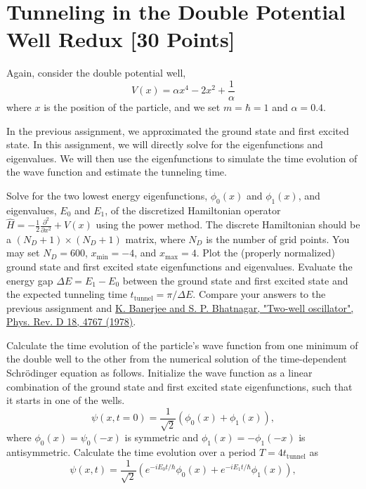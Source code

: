 \newpage
\section{Tunneling in the Double Potential Well Redux [30 Points]}

Again, consider the double potential well,
\begin{equation}
  V(x) =  \alpha x^4  - 2x^2 + \frac{1}{\alpha}
\end{equation}
where $x$ is the position of the particle, and we set $m=\hbar=1$ and $\alpha = 0.4$.

In the previous assignment, we approximated the ground state and first excited state.
In this assignment, we will directly solve for the eigenfunctions and eigenvalues.
We will then use the eigenfunctions to simulate the time evolution of the wave function and estimate the tunneling time.

\begin{problem}[10]
Solve for the two lowest energy eigenfunctions, $\phi_0(x)$ and $\phi_1(x)$, and eigenvalues, $E_0$ and $E_1$, of the discretized Hamiltonian operator $\hat H = -\frac{1}{2}\frac{\partial^2}{\partial x^2} + V(x)$ using the power method.
The discrete Hamiltonian should be a $(N_D+1)\times(N_D+1)$ matrix, where $N_D$ is the number of grid points.
You may set $N_D=600$, $x_{\min} = -4$, and $x_{\max} = 4$.
Plot the (properly normalized) ground state and first excited state eigenfunctions and eigenvalues.
Evaluate the energy gap $\Delta E = E_1 - E_0$ between the ground state and first excited state and the expected tunneling time $t_\mathrm{tunnel} = \pi/\Delta E$.
Compare your answers to the previous assignment and \href{http://doi.org/10.1103/PhysRevD.18.4767}{K. Banerjee and S. P. Bhatnagar, "Two-well oscillator", Phys. Rev. D 18, 4767 (1978)}.
\end{problem}

\begin{solution}
\end{solution}

\begin{problem}[10]
Calculate the time evolution of the particle's wave function from one minimum of the double well to the other from the numerical solution of the time-dependent Schr\"{o}dinger equation as follows.
Initialize the wave function as a linear combination of the ground state and first excited state eigenfunctions, such that it starts in one of the wells.
\begin{equation}
  \psi(x, t=0) = \frac{1}{\sqrt{2}}\left ( \phi_0(x) + \phi_1(x)\right ),
\end{equation}
where $\phi_0(x)= \psi_0(-x)$ is symmetric and $\phi_1(x) = -\phi_1(-x)$ is antisymmetric.
Calculate the time evolution over a period $T = 4t_\mathrm{tunnel}$ as
\begin{equation}
  \psi(x, t) = \frac{1}{\sqrt{2}}\left (e^{-iE_0t/\hbar} \phi_0(x) + e^{-iE_1t/\hbar}\phi_1(x)\right ),
\end{equation}
\end{problem}

